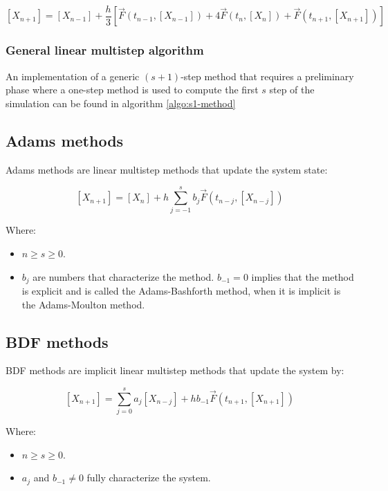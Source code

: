     $$[X_{n+1}] = [X_{n-1}] + \frac{h}{3}[\vec{F}(t_{n-1}, [X_{n-1}]) + 4\vec{F}(t_n, [X_n]) + \vec{F}(t_{n+1}, [X_{n+1}])]$$

    \subsubsection{General linear multistep algorithm}
    An implementation of a generic $(s+1)$-step method that requires a preliminary phase where a one-step method is used to compute the first $s$ step of the simulation can be found in algorithm \ref{algo:s1-method}

    

  \subsection{Adams methods}
  Adams methods are linear multistep methods that update the system state:

  $$[X_{n+1}] = [X_n] + h\sum\limits_{j=-1}^sb_j\vec{F}(t_{n-j}, [X_{n-j}])$$

  Where:

  \begin{multicols}{2}
    \begin{itemize}
      \item $n\ge s\ge 0$.
      \item $b_j$ are numbers that characterize the method.
        $b_{-1} = 0$ implies that the method is explicit and is called the Adams-Bashforth method, when it is implicit is the Adams-Moulton method.
    \end{itemize}
  \end{multicols}

  \subsection{BDF methods}
  BDF methods are implicit linear multistep methods that update the system by:

  $$[X_{n+1}] = \sum\limits_{j=0}^sa_j[X_{n-j}] + hb_{-1}\vec{F}(t_{n+1}, [X_{n+1}])$$

  Where:

  \begin{multicols}{2}
    \begin{itemize}
      \item $n\ge s\ge 0$.
      \item $a_j$ and $b_{-1}\neq 0$ fully characterize the system.
    \end{itemize}
  \end{multicols}




